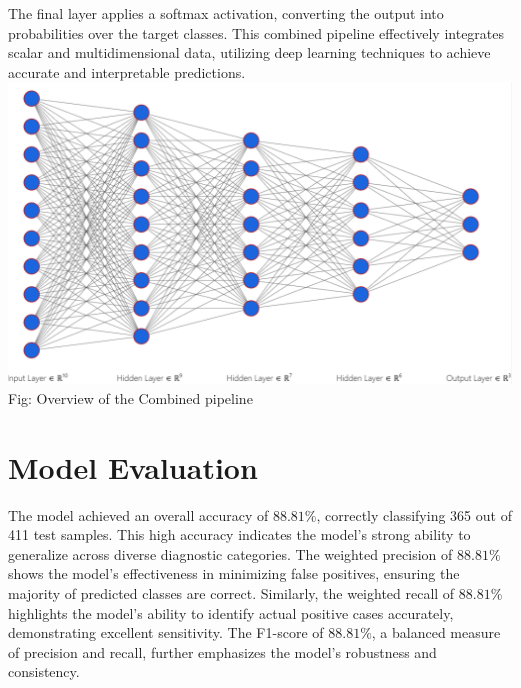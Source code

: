 \documentclass[twocolumn]{article}
\begin{document}
The final layer applies a softmax activation, converting the output into probabilities over the target classes. This combined pipeline effectively integrates scalar and multidimensional data, utilizing deep learning techniques to achieve accurate and interpretable predictions.
\includegraphics[scale=0.3]{Main Pipeline.png}
Fig: Overview of the Combined pipeline

\section{Model Evaluation}

The model achieved an overall accuracy of \(88.81\%\), correctly classifying 365 out of 411 test samples. This high accuracy indicates the model's strong ability to generalize across diverse diagnostic categories. The weighted precision of \(88.81\%\) shows the model's effectiveness in minimizing false positives, ensuring the majority of predicted classes are correct. Similarly, the weighted recall of \(88.81\%\) highlights the model's ability to identify actual positive cases accurately, demonstrating excellent sensitivity. The F1-score of \(88.81\%\), a balanced measure of precision and recall, further emphasizes the model's robustness and consistency.
\end{document}
